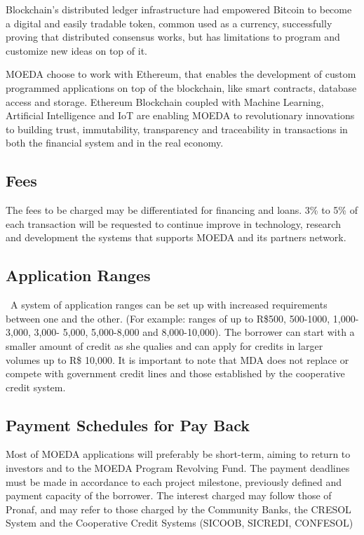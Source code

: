 \documentclass{article}
\begin{document}
Blockchain’s distributed ledger infrastructure had empowered Bitcoin to become a digital and easily tradable token, common used as a currency, successfully proving that distributed consensus works, but has limitations to program and customize new ideas on top of it.

MOEDA choose to work with Ethereum, that enables the development of custom programmed applications on top of the blockchain, like smart contracts, database access and storage. Ethereum Blockchain coupled with Machine Learning, Artificial Intelligence and IoT are enabling MOEDA to revolutionary innovations to building trust, immutability, transparency and traceability in transactions in both the financial system and in the real economy.

\subsection {Fees}

The fees to be charged may be differentiated for financing and loans. 3\% to 5\% of each transaction will be requested to continue improve in technology, research and development the systems that supports MOEDA and its partners network.

\subsection {Application Ranges}

 A system of application ranges can be set up with increased requirements between one and the other. (For example: ranges of up to R\$500, 500-1000, 1,000-3,000, 3,000- 5,000, 5,000-8,000 and 8,000-10,000). The borrower can start with a smaller amount of credit as she qualies and can apply for credits in larger volumes up to R\$ 10,000. It is important to note that MDA does not replace or compete with government credit lines and those established by the cooperative credit system.

\subsection {Payment Schedules for Pay Back}

Most of MOEDA applications will preferably be short-term, aiming to return to investors and to the MOEDA Program Revolving Fund. The payment deadlines must be made in accordance to each project milestone, previously defined and payment capacity of the borrower. The interest charged may follow those of Pronaf, and may refer to those charged by the Community Banks, the CRESOL System and the Cooperative Credit Systems (SICOOB, SICREDI, CONFESOL)
\end{document}
